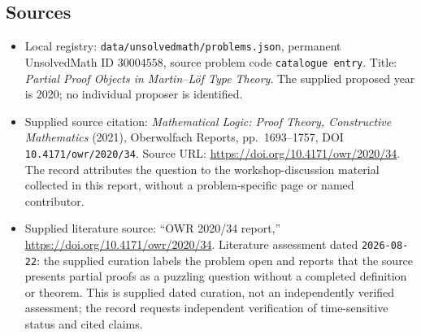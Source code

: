 \documentclass[11pt]{article}
\begin{document}
\subsection{Sources}
\begin{itemize}
\item Local registry: \texttt{data/unsolvedmath/problems.json}, permanent UnsolvedMath ID \(30004558\), source problem code \texttt{catalogue entry}. Title: \emph{Partial Proof Objects in Martin--L\"of Type Theory}. The supplied proposed year is 2020; no individual proposer is identified.
\item Supplied source citation: \emph{Mathematical Logic: Proof Theory, Constructive Mathematics} (2021), Oberwolfach Reports, pp.\ 1693--1757, DOI \texttt{10.4171/owr/2020/34}. Source URL: \url{https://doi.org/10.4171/owr/2020/34}. The record attributes the question to the workshop-discussion material collected in this report, without a problem-specific page or named contributor.
\item Supplied literature source: ``OWR 2020/34 report,'' \url{https://doi.org/10.4171/owr/2020/34}. Literature assessment dated \texttt{2026-08-22}: the supplied curation labels the problem open and reports that the source presents partial proofs as a puzzling question without a completed definition or theorem. This is supplied dated curation, not an independently verified assessment; the record requests independent verification of time-sensitive status and cited claims.
\end{itemize}
\end{document}
